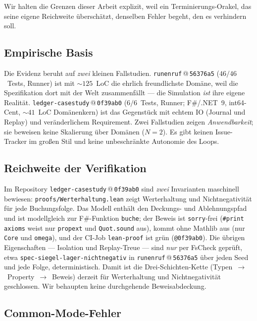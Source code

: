 \documentclass[11pt,a4paper]{article}
\theoremstyle{definition}
\theoremstyle{remark}
\begin{document}
Wir halten die Grenzen dieser Arbeit explizit, weil ein Terminierungs-Orakel,
das seine eigene Reichweite überschätzt, denselben Fehler begeht, den es
verhindern soll.

\subsection{Empirische Basis}
\label{sec:grenzen-empirie}

Die Evidenz beruht auf \emph{zwei} kleinen Fallstudien.
\texttt{runenruf}\,@\,\texttt{56376a5} ($46/46$~Tests, Runner) ist mit $\sim 125$~LoC die
ehrlich freundlichste Domäne, weil die Spezifikation dort mit der Welt
zusammenfällt --- die Simulation \emph{ist} ihre eigene Realität.
\texttt{ledger-casestudy}\,@\,\texttt{0f39ab0} ($6/6$~Tests, Runner; F\#/.NET~9, int64-Cent,
$\sim 41$~LoC Domänenkern) ist das Gegenstück mit echtem IO (Journal und
Replay) und veränderlichem Requirement. Zwei Fallstudien zeigen
\emph{Anwendbarkeit}; sie beweisen keine Skalierung über Domänen ($N=2$). Es
gibt keinen Issue-Tracker im großen Stil und keine unbeschränkte Autonomie des
Loops.

\subsection{Reichweite der Verifikation}
\label{sec:grenzen-lean}

Im Repository \texttt{ledger-casestudy}\,@\,\texttt{0f39ab0} sind \emph{zwei} Invarianten
maschinell bewiesen: \texttt{proofs/Werterhaltung.lean} zeigt Werterhaltung und Nichtnegativität
für jede Buchungsfolge. Das Modell enthält den Deckungs- und Ablehnungspfad und
ist modellgleich zur F\#-Funktion \texttt{buche}; der Beweis ist
\texttt{sorry}-frei (\texttt{\#print axioms} weist nur \texttt{propext} und
\texttt{Quot.sound} aus), kommt ohne Mathlib aus (nur \texttt{Core} und
\texttt{omega}), und der CI-Job \texttt{lean-proof} ist grün
(\texttt{@0f39ab0}). Die übrigen Eigenschaften --- Isolation und
Replay-Treue --- sind \emph{nur} per FsCheck geprüft, etwa
\texttt{spec-siegel-lager-nichtnegativ} in \texttt{runenruf}\,@\,\texttt{56376a5} über jeden
Seed und jede Folge, deterministisch. Damit ist die Drei-Schichten-Kette
(Typen~$\to$~Property~$\to$~Beweis) derzeit für
Werterhaltung und Nichtnegativität geschlossen. Wir behaupten keine durchgehende Beweisabdeckung.

\subsection{Common-Mode-Fehler}
\label{sec:grenzen-commonmode}
\end{document}
